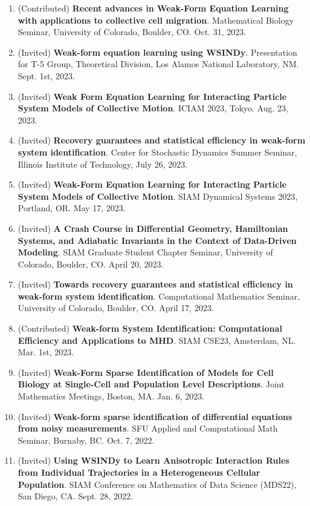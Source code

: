 \documentclass[letterpaper,11pt,oneside]{article}
\begin{document}
\begin{enumerate}
\item (Contributed) \textbf{Recent advances in Weak-Form Equation Learning with
applications to collective cell migration}. Mathematical Biology Seminar, University of Colorado, Boulder, CO. Oct. 31, 2023.
\item (Invited) \textbf{Weak-form equation learning using WSINDy}. Presentation for T-5 Group, Theoretical Division, Los Alamos National Laboratory, NM. Sept. 1st, 2023.
\item (Invited) \textbf{Weak Form Equation Learning for Interacting Particle System
Models of Collective Motion}. ICIAM 2023, Tokyo. Aug. 23, 2023.
\item (Invited) \textbf{Recovery guarantees and statistical efficiency in weak-form
system identification}. Center for Stochastic Dynamics Summer Seminar, Illinois Institute of Technology, July 26, 2023.
\item (Invited) \textbf{Weak-Form Equation Learning for Interacting Particle System Models of Collective Motion}. SIAM Dynamical Systems 2023, Portland, OR. May 17, 2023.
\item (Invited) \textbf{A Crash Course in Differential Geometry, Hamiltonian Systems, and Adiabatic Invariants in the Context of Data-Driven Modeling}. SIAM Graduate Student Chapter Seminar, University of Colorado, Boulder, CO. April 20, 2023.
\item (Invited) \textbf{Towards recovery guarantees and statistical efficiency in weak-form system identification}. Computational Mathematics Seminar, University of Colorado, Boulder, CO. April 17, 2023.
\item (Contributed) \textbf{Weak-form System Identification: Computational Efficiency and Applications to MHD}. SIAM CSE23, Amsterdam, NL. Mar. 1st, 2023.
\item (Invited) \textbf{Weak-Form Sparse Identification of Models for Cell Biology at Single-Cell and Population Level Descriptions}. Joint Mathematics Meetings, Boston, MA. Jan. 6, 2023.
\item (Invited) \textbf{Weak-form sparse identification of differential equations from noisy measurements}. SFU Applied and Computational Math Seminar, Burnaby, BC. Oct. 7, 2022.
\item (Invited) \textbf{Using WSINDy to Learn Anisotropic Interaction 
Rules from Individual Trajectories in a Heterogeneous Cellular Population}. SIAM Conference on Mathematics of Data Science (MDS22), San Diego, CA. Sept. 28, 2022.

\end{enumerate}
\end{document}
